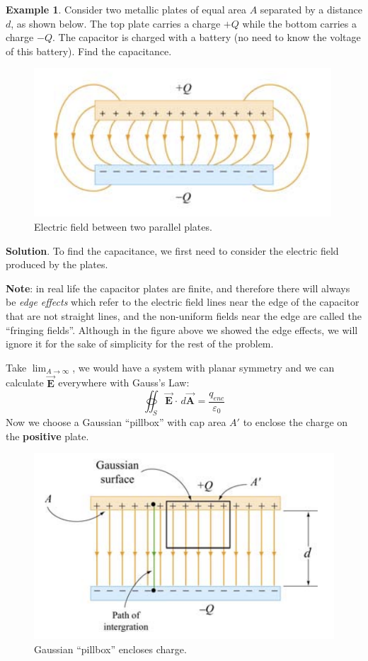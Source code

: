 \documentclass[11pt, letterpaper]{article}
\newcommand{\bv}[2][]{\bm{\vec{#2}_{#1}}}
\begin{document}
\textbf{Example 1}. Consider two metallic plates of equal area $A$ separated by a distance $d$, as shown below. The top plate carries a charge $+Q$ while the bottom carries a charge $-Q$. The capacitor is charged with a battery (no need to know the voltage of this battery). Find the capacitance. 
\begin{figure}[h!]
	\centering
	\includegraphics[scale=1]{eg1.png}
	\caption{Electric field between two parallel plates.}
	\label{fig:eg1}
\end{figure}

\textbf{Solution}. To find the capacitance, we first need to consider the electric field produced by the plates.

\textbf{Note}: in real life the capacitor plates are finite, and therefore there will always be \textit{edge effects} which refer to the electric field lines near the edge of the capacitor that are not straight lines, and the non-uniform fields near the edge are called the ``fringing fields''. Although in the figure above we showed the edge effects, we will ignore it for the sake of simplicity for the rest of the problem. 

Take $\lim_{A\to\infty}$, we would have a system with planar symmetry and we can calculate $\bv{E}$ everywhere with Gauss's Law: \[\oiint_S \bv{E}\cdot\, d\bv{A} = \frac{q_{enc}}{\varepsilon_0}\] Now we choose a Gaussian ``pillbox'' with cap area $A'$ to enclose the charge on the \textbf{positive} plate. 
\begin{figure}[h!]
	\centering
	\includegraphics[scale=0.5]{gauss.png}
	\caption{Gaussian ``pillbox'' encloses charge.}
	\label{fig:gauss}
\end{figure}
\end{document}
